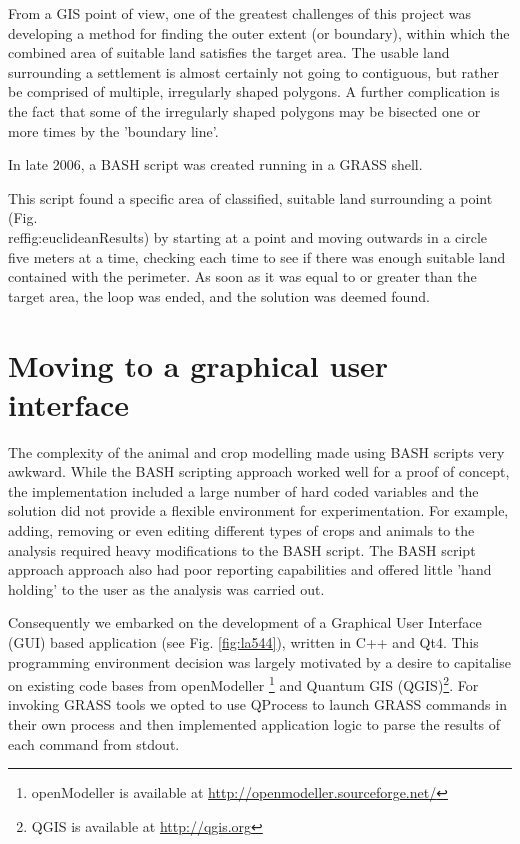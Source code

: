 From a GIS point of view, one of the greatest challenges of this project was
developing a method for finding the outer extent (or boundary), within which
the combined area of suitable land satisfies the target area.  The usable land
surrounding a settlement is almost certainly not going to contiguous, but
rather be comprised of multiple, irregularly shaped polygons. A further
complication is the fact that some of the irregularly shaped polygons may
be bisected one or more times by the 'boundary line'.  

In late 2006, a BASH script was created running in a GRASS shell.

This script found a specific area of classified, suitable land surrounding a
point (Fig.\\ref{fig:euclideanResults})  by starting at a point and moving
outwards in a circle five meters at a time, checking each time to see if there
was enough suitable land contained with the perimeter.  As soon as it was equal
to or greater than the target area, the loop was ended, and the solution was
deemed found.

\section{Moving to a graphical user interface} \label{GUI} 
 
The complexity of the animal and crop modelling made using BASH scripts very
awkward.  While the BASH scripting approach worked well for a proof of concept,
the implementation included a large number of hard coded variables and the
solution 
did not provide a flexible environment for experimentation. For example, adding,
removing or even 
editing different types of crops and animals to the analysis required heavy
modifications 
to the BASH script.  The BASH script approach approach also had poor reporting
capabilities and offered little 'hand holding' to the user as the analysis was 
carried out.

Consequently we embarked on the development of a Graphical User Interface (GUI)
based 
application (see Fig. \ref{fig:la544}), written in C++ and Qt4. This programming
environment decision was largely 
motivated by a desire to capitalise on existing code bases from openModeller
\footnote{openModeller is available at
\url{http://openmodeller.sourceforge.net/}} 
and Quantum GIS (QGIS)\footnote{QGIS is available at \url{http://qgis.org}}.  
For invoking GRASS tools we opted to use QProcess to launch GRASS commands in 
their own process and then implemented application logic to parse the results
of 
each command from stdout.

